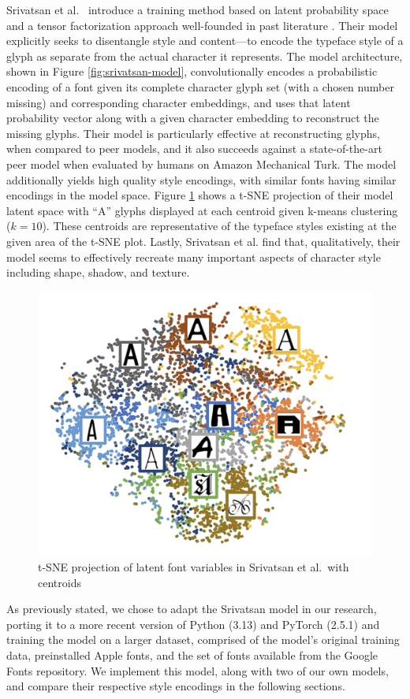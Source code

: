 Srivatsan et al.\ \cite{srivatsan2020} introduce a training method based on latent probability space and a tensor factorization approach well-founded in past literature \cite{freeman1997,tenenbaum2000,vasilescu2002,tang2013}. Their model explicitly seeks to disentangle style and content—to encode the typeface style of a glyph as separate from the actual character it represents. The model architecture, shown in Figure \ref{fig:srivatsan-model}, convolutionally encodes a probabilistic encoding of a font given its complete character glyph set (with a chosen number missing) and corresponding character embeddings, and uses that latent probability vector along with a given character embedding to reconstruct the missing glyphs. Their model is particularly effective at reconstructing glyphs, when compared to peer models, and it also succeeds against a state-of-the-art peer model \cite{azadi2017} when evaluated by humans on Amazon Mechanical Turk. The model additionally yields high quality style encodings, with similar fonts having similar encodings in the model space. Figure \ref{fig:srivatsan-latent} shows a t-SNE projection of their model latent space with ``A'' glyphs displayed at each centroid given k-means clustering ($k=10$). These centroids are representative of the typeface styles existing at the given area of the t-SNE plot. Lastly, Srivatsan et al. find that, qualitatively, their model seems to effectively recreate many important aspects of character style including shape, shadow, and texture.

\begin{figure}[]
    \centering
    \includegraphics[width=.7\textwidth]{images/srivatsan-latent.png}
    \caption{t-SNE projection of latent font variables in Srivatsan et al.\ with centroids}
    \label{fig:srivatsan-latent}
\end{figure}

As previously stated, we chose to adapt the Srivatsan model in our research, porting it to a more recent version of Python (3.13) and PyTorch (2.5.1) and training the model on a larger dataset, comprised of the model's original training data, preinstalled Apple fonts, and the set of fonts available from the Google Fonts repository. We implement this model, along with two of our own models, and compare their respective style encodings in the following sections.